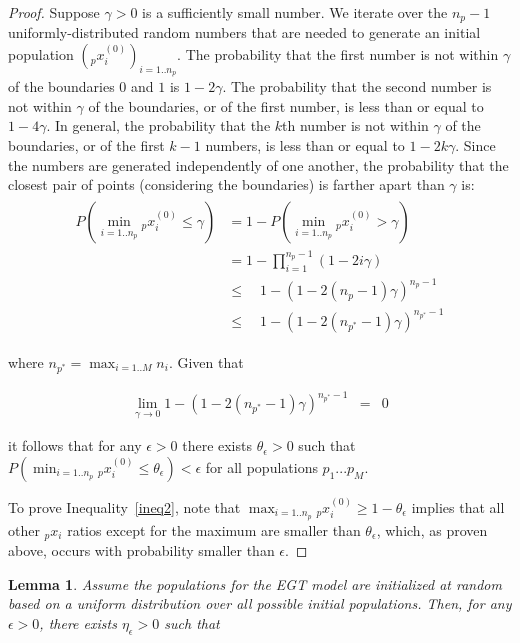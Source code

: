 \documentclass{sig-alt-full}
\newtheorem{lemma}{Lemma}
\begin{document}
\begin{multicols}{2}
\begin{proof}
Suppose $\gamma>0$ is a sufficiently small number.  We iterate over the $n_p - 1$ uniformly-distributed random numbers that are needed to generate an initial population $({_p}x^{(0)}_i)_{i=1..n_p}$.  The probability that the first number is not within $\gamma$ of the boundaries $0$ and $1$ is $1-2\gamma$.  The probability that the second number is not within $\gamma$ of the boundaries, or of the first number, is less than or equal to $1-4\gamma$.  In general, the probability that the $k$th number is not within $\gamma$ of the boundaries, or of the first $k-1$ numbers, is less than or equal to $1-2 k \gamma$.  Since the numbers are generated independently of one another, the probability that the closest pair of points (considering the boundaries) is farther apart than $\gamma$ is:
\vspace{1em}
\begin{eqnarray*}
\begin{aligned}
P\left( \min_{i=1..n_p} {_p}x^{(0)}_i \leq \gamma \right)
&= 1 - P\left( \min_{i=1..n_p} {_p}x^{(0)}_i > \gamma \right)\\
&= 1 - \prod^{n_p - 1}_{i=1} \left( 1-2 i \gamma \right) \quad\\
&\leq \quad 1 - \left( 1 - 2 \left(n_p - 1\right) \gamma \right)^{n_p - 1}\\
&\leq \quad 1 - \left( 1 - 2 \left(n_{p^*} - 1\right) \gamma \right)^{n_{p^*} - 1}
\end{aligned}
\end{eqnarray*}

\noindent where $n_{p^*} = \max_{i=1..M} n_i$.  Given that

\begin{eqnarray*}
\lim_{\gamma \rightarrow 0} 1 - \left( 1 - 2 \left(n_{p^*} - 1\right) \gamma \right)^{n_{p^*} - 1} & = & 0
\end{eqnarray*}

\noindent it follows that for any $\epsilon>0$ there exists $\theta_\epsilon>0$ such that $P( \min_{i=1..n_p} {_p}x^{(0)}_i \leq \theta_\epsilon) < \epsilon$ for all populations $p_1 ... p_M$. %

To prove Inequality~\ref{ineq2}, note that \mbox{$\max_{i=1..n_p} {_p}x^{(0)}_i \geq 1-\theta_\epsilon$} implies that all other ${_p}x_i$ ratios except for the maximum are smaller than $\theta_\epsilon$, which, as proven above, occurs with probability smaller than $\epsilon$.
\end{proof}

\begin{lemma}
Assume the populations for the EGT model are initialized at random based on a uniform distribution over all possible initial populations.  Then, for any $\epsilon>0$, there exists $\eta_\epsilon>0$ such that


\end{lemma}
\end{multicols}
\end{document}
